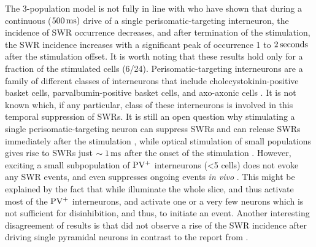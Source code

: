    The 3-population model is not fully in line with who \cite{Ellender2010}
    have shown that during a continuous ($500\, \rm ms)$ drive of a single
    perisomatic-targeting interneuron, the incidence of SWR occurrence
    decreases, and after termination of the stimulation, the SWR incidence
    increases with a significant peak of occurrence 1 to $2\,\rm seconds$ after
    the stimulation offset. It is worth noting that these results hold only for
    a fraction of the stimulated cells (6/24). Perisomatic-targeting
    interneurons are a family of different classes of interneurons that include
    cholecystokinin-positive basket cells, parvalbumin-positive basket cells,
    and axo-axonic cells \citep{Freund1996}. It is not known which, if any
    particular, class of these interneurons is involved in this temporal
    suppression of SWRs. It is still an open question why stimulating a single
    perisomatic-targeting neuron can suppress SWRs and can release SWRs immediately
    after the stimulation \citep{Ellender2010}, while optical stimulation of small populations
    gives rise to SWRs just $\sim 1\, \rm ms$ after the onset of the
    stimulation \citep{Schlingloff2014}. However, exciting a small
    subpopulation of $\rm PV^+$ interneurons (<5 cells) does not evoke any SWR
    events, and even suppresses ongoing events \textit{in vivo}
    \citep{Stark2014}. This might be explained by the fact that while
    \cite{Schlingloff2014} illuminate the whole slice, and thus activate most
    of the $\rm PV^+$ interneurons, \cite{Ellender2010} and \cite{Stark2014}
    activate one or a very few neurons which is not sufficient for
    disinhibition, and thus, to initiate an event. Another interesting
    disagreement of results is that \cite{Ellender2010} did not observe a rise
    of the SWR incidence after driving single pyramidal neurons in contrast to
    the report from \cite{Bazelot2016}.
    
